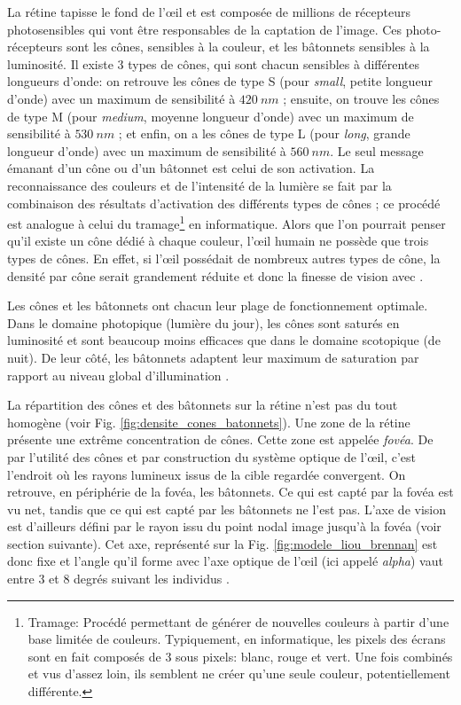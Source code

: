 	\par La rétine tapisse le fond de l'œil et est composée de millions de récepteurs photosensibles qui vont être responsables de la captation de l'image. Ces photo-récepteurs sont les cônes, sensibles à la couleur, et les bâtonnets sensibles à la luminosité. Il existe 3 types de cônes, qui sont chacun sensibles à différentes longueurs d'onde: on retrouve les cônes de type S (pour \textit{small}, petite longueur d'onde) avec un maximum de sensibilité à $420~nm$ ; ensuite, on trouve les cônes de type M (pour \textit{medium}, moyenne longueur d'onde) avec un maximum de sensibilité à $530~nm$ ; et enfin, on a les cônes de type L (pour \textit{long}, grande longueur d'onde) avec un maximum de sensibilité à $560~nm$. Le seul message émanant d'un cône ou d'un bâtonnet est celui de son activation. La reconnaissance des couleurs et de l'intensité de la lumière se fait par la combinaison des résultats d'activation des différents types de cônes ; ce procédé est analogue à celui du tramage\footnote{Tramage: Procédé permettant de générer de nouvelles couleurs à partir d'une base limitée de couleurs. Typiquement, en informatique, les pixels des écrans sont en fait composés de 3 sous pixels: blanc, rouge et vert. Une fois combinés et vus d'assez loin, ils semblent ne créer qu'une seule couleur, potentiellement différente.} en informatique. Alors que l'on pourrait penser qu'il existe un cône dédié à chaque couleur, l'œil humain ne possède que trois types de cônes. En effet, si l'œil possédait de nombreux autres types de cône, la densité par cône serait grandement réduite et donc la finesse de vision avec \citep{glassner_principles_1995}.
	
	\par Les cônes et les bâtonnets ont chacun leur plage de fonctionnement optimale. Dans le domaine photopique (lumière du jour), les cônes sont saturés en luminosité et sont beaucoup moins efficaces que dans le domaine scotopique (de nuit). De leur côté, les bâtonnets adaptent leur maximum de saturation par rapport au niveau global d'illumination \citep{glassner_principles_1995}.
	
	\par La répartition des cônes et des bâtonnets sur la rétine n'est pas du tout homogène (voir Fig. \ref{fig:densite_cones_batonnets}). Une zone de la rétine présente une extrême concentration de cônes. Cette zone est appelée \textit{fovéa}. De par l'utilité des cônes et par construction du système optique de l'œil, c'est l'endroit où les rayons lumineux issus de la cible regardée convergent. On retrouve, en périphérie de la fovéa, les bâtonnets. Ce qui est capté par la fovéa est vu net, tandis que ce qui est capté par les bâtonnets ne l'est pas. L'axe de vision est d'ailleurs défini par le rayon issu du point nodal image jusqu'à la fovéa (voir section suivante). Cet axe, représenté sur la Fig. \ref{fig:modele_liou_brennan} est donc fixe et l'angle qu'il forme avec l'axe optique de l'œil (ici appelé \textit{alpha}) vaut entre 3 et 8 degrés suivant les individus \citep{gross_human_2008}.
	
